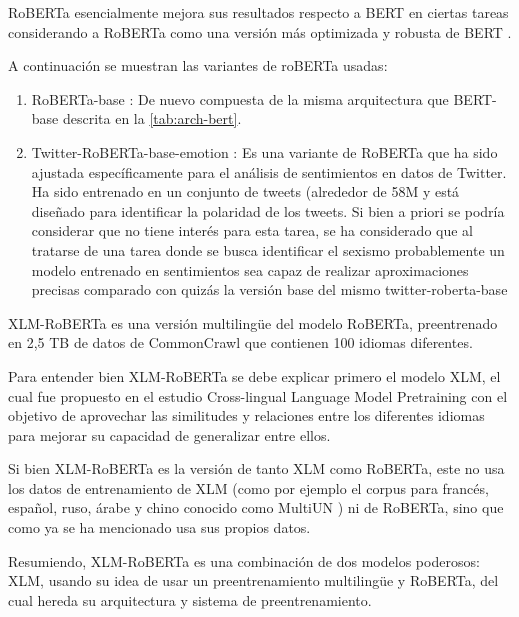 RoBERTa esencialmente mejora sus resultados respecto a BERT \cite{tarunesh2021trusting} en ciertas tareas considerando a RoBERTa como una versión más optimizada y robusta de BERT \cite{briskilal2022ensemble}. 

A continuación se muestran las variantes de roBERTa usadas:
\begin{enumerate}
    \item RoBERTa-base \cite{roberta-base}: De nuevo compuesta de la misma arquitectura que BERT-base descrita en la \autoref{tab:arch-bert}.
    \item Twitter-RoBERTa-base-emotion \cite{twitter-roberta-base-emotion}: Es una variante de RoBERTa que ha sido ajustada específicamente para el análisis de sentimientos en datos de Twitter. Ha sido entrenado en un conjunto de tweets (alrededor de 58M y está diseñado para identificar la polaridad de los tweets. Si bien a priori se podría considerar que no tiene interés para esta tarea, se ha considerado que al tratarse de una tarea donde se busca identificar el sexismo probablemente un modelo entrenado en sentimientos sea capaz de realizar aproximaciones precisas comparado con quizás la versión base del mismo twitter-roberta-base \cite{twitter-roberta-base}
\end{enumerate}

XLM-RoBERTa \cite{xlm-roberta} es una versión multilingüe del modelo RoBERTa, preentrenado en 2,5 TB de datos de CommonCrawl \cite{commoncrawl} que contienen 100 idiomas diferentes. 

Para entender bien XLM-RoBERTa se debe explicar primero el modelo XLM, el cual fue propuesto en el estudio Cross-lingual Language Model Pretraining \cite{lample2019cross} con el objetivo de aprovechar las similitudes y relaciones entre los diferentes idiomas para mejorar su capacidad de generalizar entre ellos.

Si bien XLM-RoBERTa es la versión de tanto XLM como RoBERTa, este no usa los datos de entrenamiento de XLM (como por ejemplo el corpus para francés, español, ruso, árabe y chino conocido como MultiUN \cite{ziemski2016united})  ni de RoBERTa, sino que como ya se ha mencionado usa sus propios datos.

Resumiendo, XLM-RoBERTa es una combinación de dos modelos poderosos: XLM, usando su idea de usar un preentrenamiento multilingüe y RoBERTa, del cual hereda su arquitectura y sistema de preentrenamiento. 

